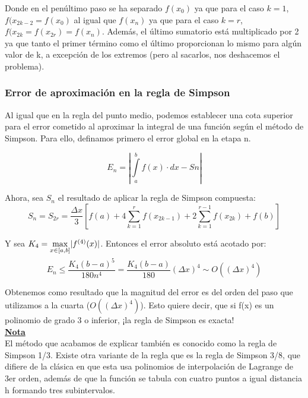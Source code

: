 \documentclass{article}
\begin{document}
			Donde en el penúltimo paso se ha separado $f(x_0)$ ya que para el caso $k=1$, $f(x_{2k-2}=f(x_0)$ al igual que $f(x_n)$ ya que para el caso $k=r$, $f(x_{2k}=f(x_{2r})=f(x_n)$. Además, el último sumatorio está multiplicado por 2 ya que tanto el primer término como el último proporcionan lo mismo para algún valor de k, a excepción de los extremos (pero al sacarlos, nos deshacemos el problema).
			
			\subsubsection{Error de aproximación en la regla de Simpson}
			
			Al igual que en la regla del punto medio, podemos establecer una cota superior para el error cometido al aproximar la integral de una función según el método de Simpson. Para ello, definamos primero el error global en la etapa n.
			
			
			\begin{equation}
				E_n=\left |\displaystyle \int \limits_{a}^{b} f(x) \cdot dx - Sn\right |
			\end{equation}
			
			Ahora, sea $S_n$ el resultado de aplicar la regla de Simpson compuesta:
			\begin{equation}
				S_n = S_{2r} = \frac{\Delta x}{3}
				[f(a)+4\sum_{k=1}^{r}f(x_{2k-1})+2\sum_{k=1}^{r-1}f(x_{2k})+f(b)]
			\end{equation}
			
			Y sea $K_4 = \smash{\displaystyle\max_{x \in [a,b]}} |f^{(4)}(x)|$. Entonces el error absoluto está acotado por:
			
			
			\begin{equation}
				E_n \leq \frac{K_4(b-a)^5}{180n^4} = \frac{K_4(b-a)}{180}(\Delta x)^4 \sim O((\Delta x)^4)
			\end{equation}
			
			Obtenemos como resultado que la magnitud del error es del orden del paso que utilizamos a la cuarta ($O((\Delta x)^4)$). Esto quiere decir, que si f(x) es un polinomio de grado 3 o inferior, ¡la regla de Simpson es exacta!\\
			
			\underline{\textbf{Nota}} \\
			
			El método que acabamos de explicar también es conocido como la regla de Simpson 1/3. Existe otra variante de la regla que es la regla de Simpson 3/8, que difiere de la clásica en que esta usa polinomios de interpolación de Lagrange de 3er orden, además de que la función se tabula con cuatro puntos a igual distancia h formando tres subintervalos. \\
			
\end{document}
